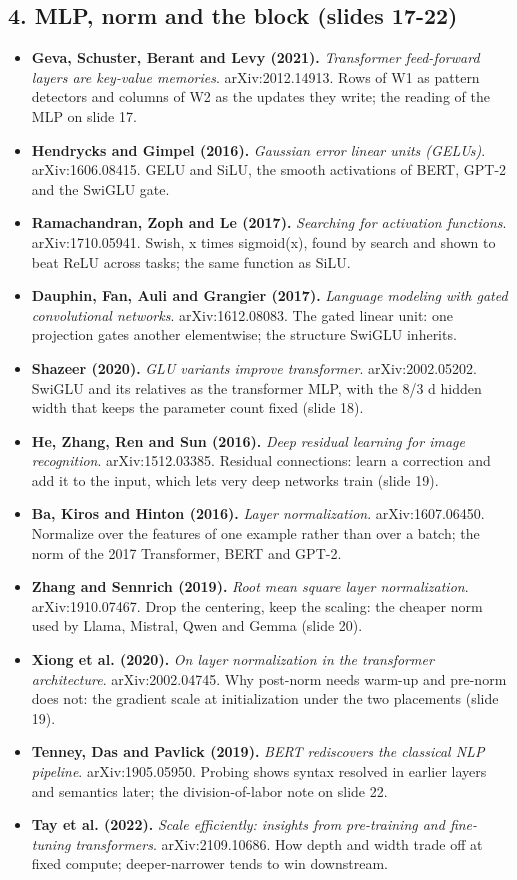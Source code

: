 \documentclass[11pt,letterpaper]{article}
\begin{document}
\subsection*{4. MLP, norm and the block (slides 17-22)}
\begin{itemize}[leftmargin=1.2em,itemsep=3pt]\sloppy
\item \textbf{Geva, Schuster, Berant and Levy (2021).} \textit{Transformer feed-forward layers are key-value memories}. arXiv:2012.14913. Rows of W1 as pattern detectors and columns of W2 as the updates they write; the reading of the MLP on slide 17.
\item \textbf{Hendrycks and Gimpel (2016).} \textit{Gaussian error linear units (GELUs)}. arXiv:1606.08415. GELU and SiLU, the smooth activations of BERT, GPT-2 and the SwiGLU gate.
\item \textbf{Ramachandran, Zoph and Le (2017).} \textit{Searching for activation functions}. arXiv:1710.05941. Swish, x times sigmoid(x), found by search and shown to beat ReLU across tasks; the same function as SiLU.
\item \textbf{Dauphin, Fan, Auli and Grangier (2017).} \textit{Language modeling with gated convolutional networks}. arXiv:1612.08083. The gated linear unit: one projection gates another elementwise; the structure SwiGLU inherits.
\item \textbf{Shazeer (2020).} \textit{GLU variants improve transformer}. arXiv:2002.05202. SwiGLU and its relatives as the transformer MLP, with the 8/3 d hidden width that keeps the parameter count fixed (slide 18).
\item \textbf{He, Zhang, Ren and Sun (2016).} \textit{Deep residual learning for image recognition}. arXiv:1512.03385. Residual connections: learn a correction and add it to the input, which lets very deep networks train (slide 19).
\item \textbf{Ba, Kiros and Hinton (2016).} \textit{Layer normalization}. arXiv:1607.06450. Normalize over the features of one example rather than over a batch; the norm of the 2017 Transformer, BERT and GPT-2.
\item \textbf{Zhang and Sennrich (2019).} \textit{Root mean square layer normalization}. arXiv:1910.07467. Drop the centering, keep the scaling: the cheaper norm used by Llama, Mistral, Qwen and Gemma (slide 20).
\item \textbf{Xiong et al. (2020).} \textit{On layer normalization in the transformer architecture}. arXiv:2002.04745. Why post-norm needs warm-up and pre-norm does not: the gradient scale at initialization under the two placements (slide 19).
\item \textbf{Tenney, Das and Pavlick (2019).} \textit{BERT rediscovers the classical NLP pipeline}. arXiv:1905.05950. Probing shows syntax resolved in earlier layers and semantics later; the division-of-labor note on slide 22.
\item \textbf{Tay et al. (2022).} \textit{Scale efficiently: insights from pre-training and fine-tuning transformers}. arXiv:2109.10686. How depth and width trade off at fixed compute; deeper-narrower tends to win downstream.
\end{itemize}
\end{document}
